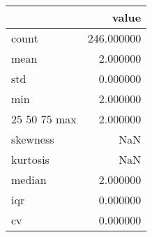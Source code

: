 \begin{tabular}{lr}
\toprule
 & value \\
\midrule
count & 246.000000 \\
mean & 2.000000 \\
std & 0.000000 \\
min & 2.000000 \\
25%
50%
75%
max & 2.000000 \\
skewness & NaN \\
kurtosis & NaN \\
median & 2.000000 \\
iqr & 0.000000 \\
cv & 0.000000 \\
\bottomrule
\end{tabular}
